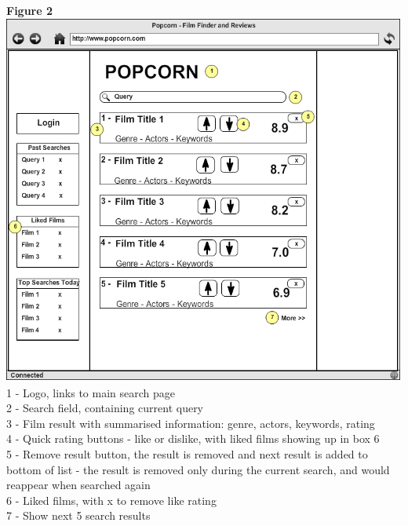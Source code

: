\documentclass{sig-alt-release2}
\begin{document}
\newpage
\textbf{Figure 2}\\
\includegraphics[scale=0.33]{wireframe2.png}\\
 
1 - Logo, links to main search page \\
2 - Search field, containing current query \\
3 - Film result with summarised information: genre, actors, keywords, rating \\
4 - Quick rating buttons - like or dislike, with liked films showing up in box 6 \\
5 - Remove result button, the result is removed and next result is added to bottom of list - the result is removed only during the current search, and would reappear when searched again \\
6 - Liked films, with x to remove like rating \\
7 - Show next 5 search results\\
\end{document}

